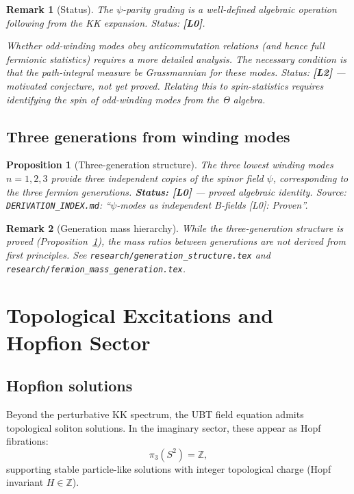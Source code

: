 \documentclass[11pt,a4paper]{article}
\newtheorem{proposition}{Proposition}
\newtheorem{remark}{Remark}
\begin{document}
\begin{remark}[Status]
  The $\psi$-parity grading is a well-defined algebraic operation following
  from the KK expansion.  Status: \textbf{[L0]}.
  
  Whether odd-winding modes obey \emph{anticommutation relations} (and hence
  full fermionic statistics) requires a more detailed analysis.  The
  necessary condition is that the path-integral measure be Grassmannian for
  these modes.  Status: \textbf{[L2]} — motivated conjecture, not yet proved.
  Relating this to spin-statistics requires identifying the spin of
  odd-winding modes from the Θ algebra.
\end{remark}

\subsection{Three generations from winding modes}

\begin{proposition}[Three-generation structure]\label{prop:gen}
  The three lowest winding modes $n = 1, 2, 3$ provide three independent
  copies of the spinor field $\psi$, corresponding to the three fermion
  generations.
  \textbf{Status: [L0]} — proved algebraic identity.
  Source: \texttt{DERIVATION\_INDEX.md}: ``$\psi$-modes as independent
  B-fields [L0]: Proven''.
\end{proposition}

\begin{remark}[Generation mass hierarchy]
  While the three-generation structure is proved (Proposition~\ref{prop:gen}),
  the mass \emph{ratios} between generations are not derived from first
  principles.  See \texttt{research/generation\_structure.tex} and
  \texttt{research/fermion\_mass\_generation.tex}.
\end{remark}

\section{Topological Excitations and Hopfion Sector}
\label{sec:topological}

\subsection{Hopfion solutions}

Beyond the perturbative KK spectrum, the UBT field equation admits
topological soliton solutions.  In the imaginary sector, these appear as
Hopf fibrations:
\begin{equation}
  \pi_3(S^2) = \mathbb{Z},
\end{equation}
supporting stable particle-like solutions with integer topological charge
(Hopf invariant $H \in \mathbb{Z}$).
\end{document}
